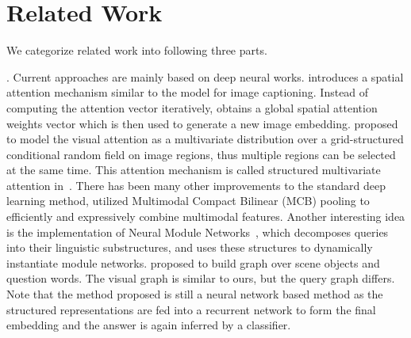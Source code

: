 \section{Related Work}
\label{sec-related-work}
\hspace{-2ex}
We categorize related work into following three parts. %


. Current \vqa approaches are mainly based on deep neural works.  \cite{zhu2016visual7w} introduces a spatial attention mechanism similar to the model for image captioning. %
Instead of computing the attention vector iteratively, \cite{xu2016ask} obtains a global spatial attention weights vector which is then used to generate a new image embedding. \cite{zhu2017structured} proposed to model the visual attention as a multivariate distribution over a grid-structured conditional random field on image regions, thus multiple regions can be selected at the same time. This attention mechanism is called structured multivariate attention in~\cite{zhu2017structured}.
There has been many other improvements to the standard deep learning method, \eg %
\cite{fukui2016multimodal} utilized Multimodal Compact Bilinear (MCB) pooling to efficiently and expressively combine multimodal features. Another interesting idea is the implementation of Neural Module Networks~\cite{Andreas_2016,hu2017learning}, which decomposes queries into their linguistic substructures, and uses these structures to dynamically instantiate module networks. %
\cite{teney2017graph} proposed to build graph over scene objects and question words. The visual graph is similar to ours, but the query graph differs. %
Note that the method \cite{teney2017graph} proposed is still a neural network based method as the structured representations are fed into a recurrent network to form the final embedding and the answer is again inferred by a classifier. %

